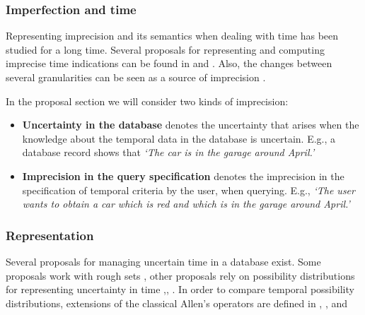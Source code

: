 \subsubsection{Imperfection and time}
Representing imprecision and its semantics when dealing with time has been studied for a long time. Several proposals for representing and computing imprecise time indications can be found in \cite{DeCaluwe1997} and \cite{DeTre1997}. Also, the changes between several granularities can be seen as a source of imprecision \cite{Devos1998}.

In the proposal section we will consider two kinds of imprecision:
\begin{itemize}
\item \textbf{Uncertainty in the database} denotes the uncertainty that arises when the knowledge about the temporal data in the database is uncertain. E.g., a database record shows that \emph{`The car is in the garage around April.'}
 \item \textbf{Imprecision in the query specification} denotes the imprecision in the specification of temporal criteria by the user, when querying. E.g., \emph{`The user wants to obtain a car which is red and which is in the garage around April.'}
\end{itemize}

\subsubsection{Representation}
Several proposals for managing uncertain time in a database exist. Some proposals work with rough sets \cite{Qiang2009}, other proposals rely on possibility distributions for representing uncertainty in time \cite{Dyreson1998},\cite{Garrido2009}, \cite{Galindo2001}. In order to compare temporal possibility distributions, extensions of the classical Allen's operators \cite{Allen1983} are defined in \cite{Ohlbach2004}, \cite{Nagypal2003},\cite{Dubois2003a} and \cite{Schockaert2008}



